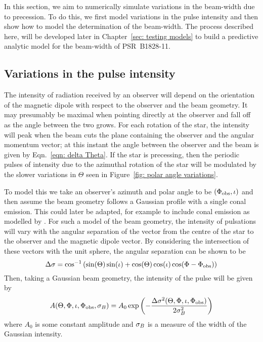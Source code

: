 \documentclass[../full_thesis/full_thesis.tex]{subfiles}
\begin{document}
In this section, we aim to numerically simulate variations in the beam-width
due to precession. To do this, we first model variations in the pulse intensity
and then show how to model the determination of the beam-width. The process
described here, will be developed later in Chapter~\ref{sec: testing models} to
build a predictive analytic model for the beam-width of PSR~B1828-11.

\subsection{Variations in the pulse intensity}

The intensity of radiation received by an observer will depend on the
orientation of the magnetic dipole with respect to the observer and the beam
geometry. It may presumably be maximal when pointing directly at the observer
and fall off as the angle between the two grows. For each rotation of the star,
the intensity will peak when the beam cuts the plane containing the observer
and the angular momentum vector; at this instant the angle between the
observer and the beam is given by Eqn.~\eqref{eqn: delta Theta}. If the star is
precessing, then the periodic pulses of intensity due to the azimuthal rotation
of the star will be modulated by the slower variations in $\Theta$ seen in
Figure~\ref{fig: polar angle variations}.

To model this we take an observer's azimuth and polar angle to be $(\Phi_{\mathrm{obs}},
\iota)$ and then assume the beam geometry follows a Gaussian profile with a
single conal emission.  This could later be adapted, for example to include
conal emission as modelled by \citet{Akgun2006}.  For such a model of the beam
geometry, the intensity of pulsations will vary with the angular separation of
the vector from the centre of the star to the observer and the magnetic dipole
vector. By considering the intersection of these vectors with the unit sphere,
the angular separation can be shown to be
\begin{equation}
\Delta\sigma = \cos^{-1}\left(\sin(\Theta)\sin(\iota) +
                             \cos(\Theta)\cos(\iota)\cos(\Phi - \Phi_{\mathrm{obs}})\right)
\label{eqn: angular sep inv cos}
\end{equation}
Then, taking a Gaussian beam geometry, the intensity of the pulse will be given by
\begin{equation}
A(\Theta, \Phi, \iota, \Phi_{\mathrm{obs}}, \sigma_{B}) =
A_{0} \exp\left(-\frac{\Delta\sigma^{2}(\Theta, \Phi, \iota, \Phi_{\mathrm{obs}})}{2\sigma_{B}^{2}}\right)
\label{eqn: Gaussian beam intensity}
\end{equation}
where $A_{0}$ is some constant amplitude and $\sigma_{B}$ is a measure of the
width of the Gaussian intensity.
\end{document}
